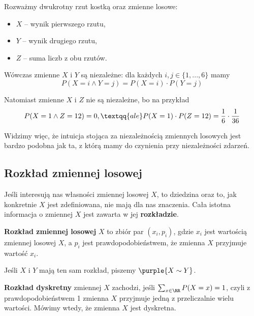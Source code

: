 \begin{example}
    Rozważmy dwukrotny rzut kostką oraz zmienne losowe:
    \begin{itemize}
        \item $X$ -- wynik pierwszego rzutu,
        \item $Y$ -- wynik drugiego rzutu,
        \item $Z$ -- suma liczb z obu rzutów.
    \end{itemize}

    Wówczas zmienne $X$ i $Y$ są niezależne: dla każdych $i, j \in \{1, ..., 6\}$ mamy
    $$P(X = i \land Y = j) = P(X = i) \cdot P(Y = j)$$

    Natomiast zmienne $X$ i $Z$ nie są niezależne, bo na przykład
    $$P(X = 1 \land Z = 12) = 0, \textqq{ale} P(X = 1) \cdot P(Z = 12) = \frac{1}{6} \cdot \frac{1}{36}$$

    Widzimy więc, że intuicja stojąca za niezależnością zmiennych losowych jest bardzo podobna jak ta, z którą mamy do czynienia przy niezależności zdarzeń.
\end{example}

\subsection{Rozkład zmiennej losowej}

Jeśli interesują nas własności zmiennej losowej $X$, to dziedzina oraz to, jak konkretnie $X$ jest zdefiniowana, nie mają dla nas znaczenia. Cała istotna informacja o zmiennej $X$ jest zawarta w jej \textbf{rozkładzie}.

\textbf{Rozkład zmiennej losowej} $X$ to zbiór par $(x_i, p_i)$, gdzie $x_i$ jest wartością zmiennej losowej $X$, a $p_i$ jest prawdopodobieństwem, że zmienna $X$ przyjmuje wartość $x_i$.

Jeśli $X$ i $Y$ mają ten sam rozkład, piszemy $\purple{X\sim Y}$.

\textbf{Rozkład dyskretny} zmiennej $X$ zachodzi, jeśli $\sum_{x\in\RR} P(X=x) = 1$, czyli z prawdopodobieństwem 1 zmienna $X$ przyjmuje jedną z przeliczalnie wielu wartości. Mówimy wtedy, że zmienna $X$ jest dyskretna.


